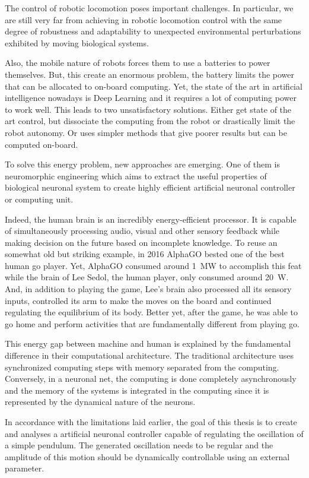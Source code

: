 The control of robotic locomotion poses important challenges. In particular, we are still very far from achieving in robotic locomotion control with the same degree of robustness and adaptability to unexpected environmental perturbations exhibited by moving biological systems.

Also, the mobile nature of robots forces them to use a batteries to power themselves. But, this create an enormous problem, the battery limits the power that can be allocated to on-board computing. Yet, the state of the art in artificial intelligence nowadays is Deep Learning and it requires a lot of computing power to work well. This leads to two unsatisfactory solutions. Either get state of the art control, but dissociate the computing from the robot or drastically limit the robot autonomy. Or uses simpler methods that give poorer results but can be computed on-board.

To solve this energy problem, new approaches are emerging. One of them is neuromorphic engineering which aims to extract the useful properties of biological neuronal system to create highly efficient artificial neuronal controller or computing unit.

Indeed, the human brain is an incredibly energy-efficient processor. It is capable of simultaneously processing audio, visual and other sensory feedback while making decision on the future based on incomplete knowledge. To reuse an somewhat old but striking example, in 2016 AlphaGO bested one of the best human go player. Yet, AlphaGO consumed around \qty{1}{\mega\watt} to accomplish this feat while the brain of Lee Sedol, the human player, only consumed around \qty{20}{\watt}. And, in addition to playing the game, Lee's brain also processed all its sensory inputs, controlled its arm to make the moves on the board and continued regulating the equilibrium of its body. Better yet, after the game, he was able to go home and perform activities that are fundamentally different from playing go.

This energy gap between machine and human is explained by the fundamental difference in their computational architecture. The traditional architecture uses synchronized computing steps with memory separated from the computing. Conversely, in a neuronal net, the computing is done completely asynchronously and the memory of the systems is integrated in the computing since it is represented by the dynamical nature of the neurons.

In accordance with the limitations laid earlier, the goal of this thesis is to create and analyses a artificial neuronal controller capable of regulating the oscillation of a simple pendulum. The generated oscillation needs to be regular and the amplitude of this motion should be dynamically controllable using an external parameter.

